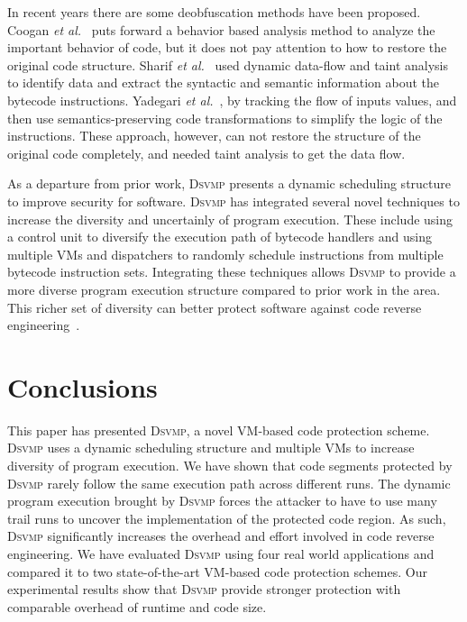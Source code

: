 \documentclass[preprint,12pt,3p]{elsarticle}
\newcommand{\DSVMP}{\textsc{Dsvmp}\xspace}
\begin{document}
In recent years there are some deobfuscation methods have been proposed.
Coogan \emph{et al.}~\cite{coogan2011deobfuscation} puts forward a behavior based analysis method to analyze the important behavior of code, but it does not pay attention to how to restore the original code structure.
Sharif \emph{et al.}~\cite{sharif2009automatic} used dynamic data-flow and taint analysis to identify data and extract the syntactic and semantic information about the bytecode instructions.
Yadegari \emph{et al.}~\cite{Yadegari2015A}, by tracking the flow of inputs values, and then use semantics-preserving code transformations to simplify the logic of the instructions.
These approach, however, can not restore the structure of the original code completely, and needed taint analysis to get the data flow.

As a departure from prior work, \DSVMP presents a dynamic scheduling structure to improve security for software.
\DSVMP has integrated several novel techniques to increase the diversity and uncertainly of program execution.
These include using a control unit to diversify the execution path of bytecode handlers and using multiple VMs
and dispatchers to randomly schedule instructions from multiple bytecode instruction sets.
Integrating these techniques allows \DSVMP to provide a more diverse program execution structure compared to prior work in the area.
This richer set of diversity can better protect software against code reverse engineering~\cite{20larsen2014sok}.


\section{Conclusions}\label{sec:con}
This paper has presented \DSVMP, a novel VM-based code protection scheme.
\DSVMP uses a dynamic scheduling structure and multiple VMs to increase
diversity of program execution. We have shown that code
segments protected by \DSVMP rarely follow the same execution path across
different runs. The dynamic program execution brought by \DSVMP forces the attacker
to have to use many trail runs to uncover the implementation of the protected code
region. As such, \DSVMP significantly increases the overhead and effort
involved in code reverse engineering. We have evaluated \DSVMP using four
real world applications and compared it to two state-of-the-art VM-based code
protection schemes. Our experimental results show that \DSVMP provide
stronger protection with comparable overhead of runtime and code size.
\end{document}
